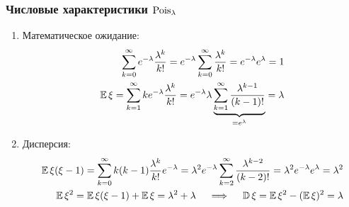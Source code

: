     \subsubsection{Числовые характеристики $\operatorname{\mathrm{Pois}}_{\lambda}$}
    \begin{enumerate}
        \item Математическое ожидание:
        \begin{align*}
            \sum\limits_{k=0}^{\infty} e^{-\lambda} \frac{\lambda^k}{k!} = e^{-\lambda} \sum\limits_{k=0}^{\infty} \frac{\lambda^k}{k!} = e^{-\lambda} e^\lambda = 1 \\
            \operatorname{\mathbb{E}} \xi = \sum\limits_{k=1}^{\infty} k e^{-\lambda} \frac{\lambda^k}{k!} = e^{-\lambda} \lambda \underbrace{\sum\limits_{k=1}^{\infty} \frac{\lambda^{k-1}}{(k - 1)!}}_{= e^\lambda} = \lambda
        \end{align*}
        \item Дисперсия:
        \begin{align*}
            \operatorname{\mathbb{E}} \xi(\xi - 1) = \sum\limits_{k=0}^{\infty} k (k - 1) \frac{\lambda^k}{k!} e^{-\lambda}  = \lambda^2 e^{-\lambda} \sum\limits_{k=2}^{\infty} \frac{\lambda^{k-2}}{(k-2)!} = \lambda^2 e^{-\lambda} e^\lambda = \lambda^2 \\
            \operatorname{\mathbb{E}} \xi^2 = \operatorname{\mathbb{E}} \xi(\xi - 1) + \operatorname{\mathbb{E}} \xi = \lambda^2 + \lambda \quad \implies \quad \operatorname{\mathbb{D}}\xi = \operatorname{\mathbb{E}} \xi^2 - (\operatorname{\mathbb{E}} \xi)^2 = \lambda
        \end{align*}
    \end{enumerate}
